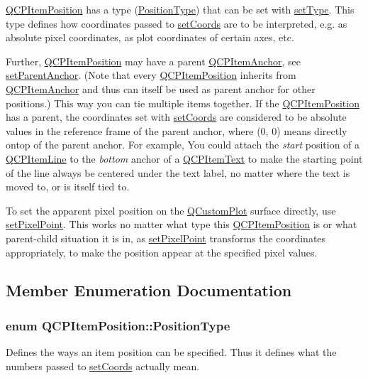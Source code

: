 \hyperlink{classQCPItemPosition}{Q\-C\-P\-Item\-Position} has a type (\hyperlink{classQCPItemPosition_aad9936c22bf43e3d358552f6e86dbdc8}{Position\-Type}) that can be set with \hyperlink{classQCPItemPosition_aa476abf71ed8fa4c537457ebb1a754ad}{set\-Type}. This type defines how coordinates passed to \hyperlink{classQCPItemPosition_aa988ba4e87ab684c9021017dcaba945f}{set\-Coords} are to be interpreted, e.\-g. as absolute pixel coordinates, as plot coordinates of certain axes, etc.

Further, \hyperlink{classQCPItemPosition}{Q\-C\-P\-Item\-Position} may have a parent \hyperlink{classQCPItemAnchor}{Q\-C\-P\-Item\-Anchor}, see \hyperlink{classQCPItemPosition_ac094d67a95d2dceafa0d50b9db3a7e51}{set\-Parent\-Anchor}. (Note that every \hyperlink{classQCPItemPosition}{Q\-C\-P\-Item\-Position} inherits from \hyperlink{classQCPItemAnchor}{Q\-C\-P\-Item\-Anchor} and thus can itself be used as parent anchor for other positions.) This way you can tie multiple items together. If the \hyperlink{classQCPItemPosition}{Q\-C\-P\-Item\-Position} has a parent, the coordinates set with \hyperlink{classQCPItemPosition_aa988ba4e87ab684c9021017dcaba945f}{set\-Coords} are considered to be absolute values in the reference frame of the parent anchor, where (0, 0) means directly ontop of the parent anchor. For example, You could attach the {\itshape start} position of a \hyperlink{classQCPItemLine}{Q\-C\-P\-Item\-Line} to the {\itshape bottom} anchor of a \hyperlink{classQCPItemText}{Q\-C\-P\-Item\-Text} to make the starting point of the line always be centered under the text label, no matter where the text is moved to, or is itself tied to.

To set the apparent pixel position on the \hyperlink{classQCustomPlot}{Q\-Custom\-Plot} surface directly, use \hyperlink{classQCPItemPosition_ab404e56d9ac2ac2df0382c57933a71ef}{set\-Pixel\-Point}. This works no matter what type this \hyperlink{classQCPItemPosition}{Q\-C\-P\-Item\-Position} is or what parent-\/child situation it is in, as \hyperlink{classQCPItemPosition_ab404e56d9ac2ac2df0382c57933a71ef}{set\-Pixel\-Point} transforms the coordinates appropriately, to make the position appear at the specified pixel values. 

\subsection{Member Enumeration Documentation}
\hypertarget{classQCPItemPosition_aad9936c22bf43e3d358552f6e86dbdc8}{
\subsubsection[{Position\-Type}]{\setlength{\rightskip}{0pt plus 5cm}enum {\bf Q\-C\-P\-Item\-Position\-::\-Position\-Type}}}\label{classQCPItemPosition_aad9936c22bf43e3d358552f6e86dbdc8}
Defines the ways an item position can be specified. Thus it defines what the numbers passed to \hyperlink{classQCPItemPosition_aa988ba4e87ab684c9021017dcaba945f}{set\-Coords} actually mean.

